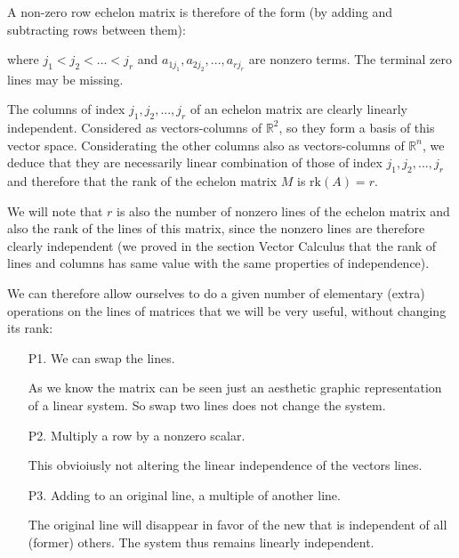 	A non-zero row echelon matrix is therefore of the form (by adding and subtracting rows between them):
	
	where $j_1<j_2<...<j_r$ and $a_{1j_1},a_{2j_2},...,a_{rj_r}$ are nonzero terms. The terminal zero lines may be missing.
	
	The columns of index $j_1,j_2,...,j_r$ of an echelon matrix are clearly linearly independent. Considered as vectors-columns of $\mathbb{R}^2$, so they form a basis of this vector space. Considerating the other columns also as vectors-columns of $\mathbb{R}^n$, we deduce that they are necessarily linear combination of those of index  $j_1,j_2,...,j_r$ and therefore that the rank of the echelon matrix $M$ is $\text{rk}(A)=r$.
	
	We will note that $r$ is also the number of nonzero lines of the echelon matrix and also the rank of the lines of this matrix, since the nonzero lines are therefore clearly independent (we proved in the section Vector Calculus that the rank of lines and columns has same value with the same properties of independence).
	
	We can therefore allow ourselves to do a given number of elementary (extra) operations on the lines of matrices that we will be very useful, without changing its rank:
	\begin{enumerate}
		\item[P1.] We can swap the lines.
		\begin{tcolorbox}[title=Remark,colframe=black,arc=10pt]
		As we know the matrix can be seen just an aesthetic graphic representation of a linear system. So swap two lines does not change the system.
		\end{tcolorbox} 
		
		\item[P2.] Multiply a row by a nonzero scalar.
		\begin{tcolorbox}[title=Remark,colframe=black,arc=10pt]
		This obvioiusly not altering the linear independence of the vectors lines.
		\end{tcolorbox} 
		
		\item[P3.] Adding to an original line, a multiple of another line.
		\begin{tcolorbox}[title=Remark,colframe=black,arc=10pt]
		The original line will disappear in favor of the new that is independent of all (former) others. The system thus remains linearly independent.
		\end{tcolorbox} 
	\end{enumerate}
	
